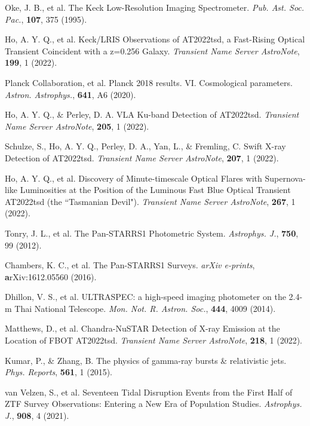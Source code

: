 \documentclass{nature_plusfigure}
\newcommand{\mn}{{Mon. Not. R. Astron. Soc.}}
\newcommand{\physrep}{{Phys. Reports}}
\newcommand{\mnras}{\mn}
\newcommand{\apj}{{Astrophys. J.}}
\newcommand{\aap}{{Astron. Astrophys.}}
\newcommand{\pasp}{{Pub. Ast. Soc. Pac.}}
\begin{document}
\begin{thebibliography}{100}
 Oke, J. B., et al. The Keck Low-Resolution Imaging Spectrometer. \emph{\pasp}, \textbf{107}, 375 (1995). 

 Ho, A. Y. Q., et al. Keck/LRIS Observations of AT2022tsd, a Fast-Rising Optical Transient Coincident with a z=0.256 Galaxy. \emph{Transient Name Server AstroNote}, \textbf{199}, 1 (2022). 

 Planck Collaboration, et al. Planck 2018 results. VI. Cosmological parameters. \emph{\aap}, \textbf{641}, A6 (2020). 

 Ho, A. Y. Q., \& Perley, D. A. VLA Ku-band Detection of AT2022tsd. \emph{Transient Name Server AstroNote}, \textbf{205}, 1 (2022). 

 Schulze, S., Ho, A. Y. Q., Perley, D. A., Yan, L., \& Fremling, C. Swift X-ray Detection of AT2022tsd. \emph{Transient Name Server AstroNote}, \textbf{207}, 1 (2022). 

 Ho, A. Y. Q., et al. Discovery of Minute-timescale Optical Flares with Supernova-like Luminosities at the Position of the Luminous Fast Blue Optical Transient AT2022tsd (the ``Tasmanian Devil"). \emph{Transient Name Server AstroNote}, \textbf{267}, 1 (2022). 

 Tonry, J. L., et al. The Pan-STARRS1 Photometric System. \emph{\apj}, \textbf{750}, 99 (2012). 

 Chambers, K. C., et al. The Pan-STARRS1 Surveys. \emph{arXiv e-prints}, \textbf arXiv:1612.05560 (2016). 

 Dhillon, V. S., et al. ULTRASPEC: a high-speed imaging photometer on the 2.4-m Thai National Telescope. \emph{\mnras}, \textbf{444}, 4009 (2014). 

 Matthews, D., et al. Chandra-NuSTAR Detection of X-ray Emission at the Location of FBOT AT2022tsd. \emph{Transient Name Server AstroNote}, \textbf{218}, 1 (2022). 


 Kumar, P., \& Zhang, B. The physics of gamma-ray bursts \& relativistic jets. \emph{\physrep}, \textbf{561}, 1 (2015). 

 van Velzen, S., et al. Seventeen Tidal Disruption Events from the First Half of ZTF Survey Observations: Entering a New Era of Population Studies. \emph{\apj}, \textbf{908}, 4 (2021). 


\end{thebibliography}
\end{document}
